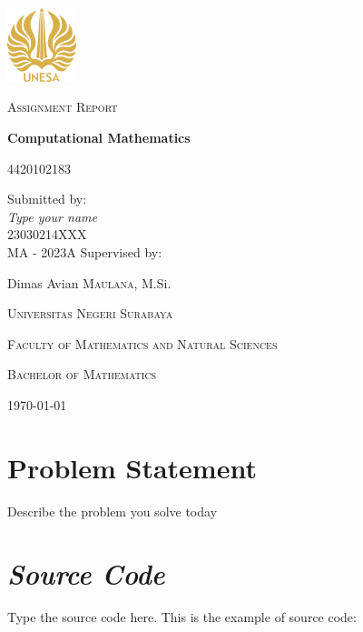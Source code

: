 \documentclass[english,12pt,a4paper,final]{article}
\begin{document}
	\begin{titlepage}
		\centering
		\includegraphics[width=0.15\textwidth]{logounesa.png}\par\vspace{1cm}
		{\Large \textsc{Assignment Report}\par}
		{\LARGE\bfseries Computational Mathematics\par}
		{\large \textsc{4420102183}\par}
		\vspace{7cm}
		Submitted by:\\[2ex]
		{\large\itshape Type your name}\\
		23030214XXX\\
		MA - 2023A
		\vfill
		Supervised by:\par
		Dimas Avian \textsc{Maulana}, M.Si.\\
		
		\vfill
		{\large\textsc{Universitas Negeri Surabaya} \par}
		{\large\textsc{Faculty of Mathematics and Natural Sciences} \par}
		{\large\textsc{Bachelor of Mathematics} \par}
		\vspace{1cm}
		{\large \today\par}
	\end{titlepage}
	
	\section{Problem Statement}
	Describe the problem you solve today
	
	\section{\textit{Source Code}}
	Type the source code here. This is the example of source code:
	
\end{document}
